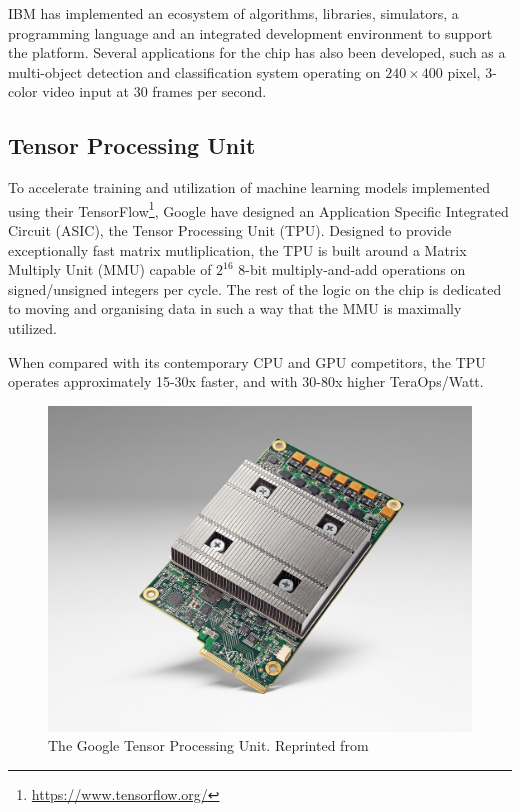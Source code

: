 IBM has implemented an ecosystem of algorithms, libraries, simulators, a
programming language and an integrated development environment to support the
platform. Several applications for the chip has also been developed, such as a
multi-object detection and classification system operating on $240\times400$
pixel, 3-color video input at 30 frames per second.

\subsection{Tensor Processing Unit}

To accelerate training and utilization of machine learning models implemented
using their TensorFlow\footnote{\url{https://www.tensorflow.org/}}, Google have
designed an Application Specific Integrated Circuit (ASIC), the Tensor
Processing Unit (TPU)\cite{Jouppi2017}. Designed to provide exceptionally fast
matrix mutliplication, the TPU is built around a Matrix Multiply Unit (MMU)
capable of $2^{16}$ 8-bit multiply-and-add operations on signed/unsigned
integers per cycle. The rest of the logic on the chip is dedicated to moving and
organising data in such a way that the MMU is maximally utilized.

When compared with its contemporary CPU and GPU competitors, the TPU operates
approximately 15-30x faster, and with 30-80x higher TeraOps/Watt.

\begin{figure}[ht]
  \centering
  \includegraphics[width=0.8\linewidth]{fig/tpu-img}
  \caption[The Google Tensor Processing Unit]{The Google Tensor Processing Unit. Reprinted from \footnotemark}
  \label{fig:tpu-arch}
\end{figure}



\cleardoublepage

